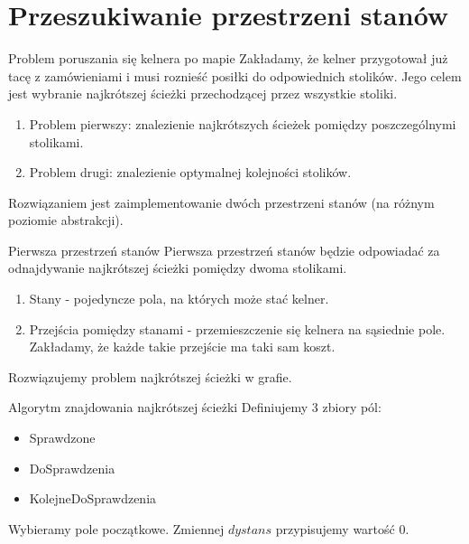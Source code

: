 \documentclass[a4paper,10pt]{beamer}
\begin{document}
		\section{Przeszukiwanie przestrzeni stanów}
		\begin{frame}{Problem poruszania się kelnera po mapie}
			Zakładamy, że kelner przygotował już tacę z zamówieniami i musi roznieść posiłki do odpowiednich stolików. Jego celem jest wybranie najkrótszej ścieżki przechodzącej przez wszystkie stoliki.
			\begin{enumerate}
				\item Problem pierwszy: znalezienie najkrótszych ścieżek pomiędzy poszczególnymi stolikami.
				\item Problem drugi: znalezienie optymalnej kolejności stolików.
			\end{enumerate}
			Rozwiązaniem jest zaimplementowanie dwóch przestrzeni stanów (na różnym poziomie abstrakcji).
		\end{frame}
		\begin{frame}{Pierwsza przestrzeń stanów}
			Pierwsza przestrzeń stanów będzie odpowiadać za odnajdywanie najkrótszej ścieżki pomiędzy dwoma stolikami.
			\begin{enumerate}
				\item Stany - pojedyncze pola, na których może stać kelner.
				\item Przejścia pomiędzy stanami - przemieszczenie się kelnera na sąsiednie pole. Zakładamy, że każde takie przejście ma taki sam koszt.
			\end{enumerate}
			Rozwiązujemy problem najkrótszej ścieżki w grafie.
		\end{frame}
		\begin{frame}{Algorytm znajdowania najkrótszej ścieżki}
			Definiujemy $3$ zbiory pól:
			\begin{itemize}
				\item Sprawdzone
				\item DoSprawdzenia
				\item KolejneDoSprawdzenia
			\end{itemize}
			Wybieramy pole początkowe. Zmiennej $dystans$ przypisujemy wartość $0$.
		\end{frame}
\end{document}
